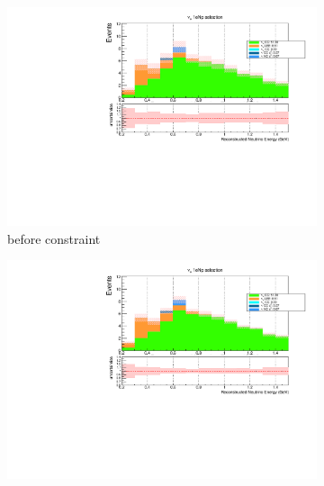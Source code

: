 \documentclass[a4paper]{article}
\begin{document}
{}

\begin{figure}[ht] 
\begin{center}
    \begin{subfigure}[b]{0.45\textwidth}
    \centering
    \includegraphics[width=1.00\textwidth]{Sensitivity/numuconstraint/nuenumu_reco_e1_before_constraint.pdf}
    \caption{before constraint}
    \end{subfigure}
    \begin{subfigure}[b]{0.45\textwidth}
    \centering
    \includegraphics[width=1.00\textwidth]{Sensitivity/numuconstraint/nuenumu_reco_e1_after_constraint.pdf}

\end{subfigure}
\end{center}
\end{figure}
\end{document}
